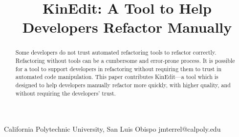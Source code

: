 \documentclass{sigplanconf}
\begin{document}
\setlength{\pdfpageheight}{\paperheight}
\setlength{\pdfpagewidth}{\paperwidth}




\permissiontopublish             %


\newcommand{\pname}{KinEdit}

\title{\pname{}: A Tool to Help Developers Refactor Manually}

           {California Polytechnic University, San Luis Obispo}
           {jmterrel@calpoly.edu}

\maketitle

\begin{abstract}
Some developers do not trust automated refactoring tools to refactor correctly.
Refactoring without tools can be a cumbersome and error-prone process.
It is possible for a tool to support developers in refactoring without
requiring them to trust in automated code manipulation.
This paper contributes \pname{}---a tool which is designed to help developers
manually refactor more quickly, with higher quality,
and without requiring the developers' trust.
\end{abstract}


\end{document}
